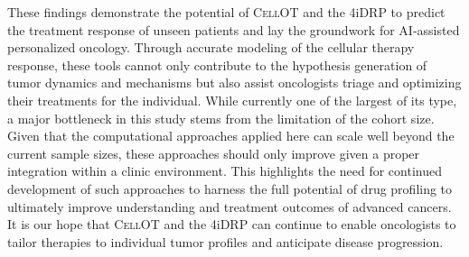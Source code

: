 These findings demonstrate the potential of \textsc{CellOT} and the 4iDRP to predict the treatment response of unseen patients and lay the groundwork for AI-assisted personalized oncology.
Through accurate modeling of the cellular therapy response, these tools cannot only contribute to the hypothesis generation of tumor dynamics and mechanisms but also assist oncologists triage and optimizing their treatments for the individual.
While currently one of the largest of its type, a major bottleneck in this study stems from the limitation of the cohort size.
Given that the computational approaches applied here can scale well beyond the current sample sizes, these approaches should only improve given a proper integration within a clinic environment.
This highlights the need for continued development of such approaches to harness the full potential of drug profiling to ultimately improve understanding and treatment outcomes of advanced cancers.
It is our hope that \textsc{CellOT} and the 4iDRP can continue to enable oncologists to tailor therapies to individual tumor profiles and anticipate disease progression.

